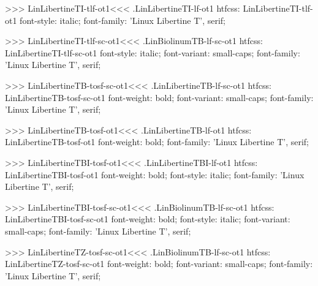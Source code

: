 {{{{{{{>>>
\<LinLibertineTI-tlf-ot1\><<<
.LinLibertineTI-lf-ot1
htfcss:  LinLibertineTI-tlf-ot1  font-style: italic; font-family: 'Linux Libertine T', serif;

>>>
\<LinLibertineTI-tlf-sc-ot1\><<<
.LinBiolinumTB-lf-sc-ot1
htfcss:  LinLibertineTI-tlf-sc-ot1  font-style: italic; font-variant: small-caps; font-family: 'Linux Libertine T', serif;

>>>
\<LinLibertineTB-tosf-sc-ot1\><<<
.LinLibertineTB-lf-sc-ot1
htfcss:  LinLibertineTB-tosf-sc-ot1  font-weight: bold; font-variant: small-caps; font-family: 'Linux Libertine T', serif;

>>>
\<LinLibertineTB-tosf-ot1\><<<
.LinLibertineTB-lf-ot1
htfcss:  LinLibertineTB-tosf-ot1  font-weight: bold; font-family: 'Linux Libertine T', serif;

>>>
\<LinLibertineTBI-tosf-ot1\><<<
.LinLibertineTBI-lf-ot1
htfcss:  LinLibertineTBI-tosf-ot1  font-weight: bold; font-style: italic; font-family: 'Linux Libertine T', serif;

>>>
\<LinLibertineTBI-tosf-sc-ot1\><<<
.LinBiolinumTB-lf-sc-ot1
htfcss:  LinLibertineTBI-tosf-sc-ot1  font-weight: bold; font-style: italic; font-variant: small-caps; font-family: 'Linux Libertine T', serif;

>>>
\<LinLibertineTZ-tosf-sc-ot1\><<<
.LinBiolinumTB-lf-sc-ot1
htfcss:  LinLibertineTZ-tosf-sc-ot1  font-weight: bold; font-variant: small-caps; font-family: 'Linux Libertine T', serif;

}}}}}}}
